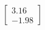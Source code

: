 \documentclass[preview]{standalone}
\begin{document}
\begin{align*}
\begin{bmatrix} 3.16 \\ -1.98 \end{bmatrix}
\end{align*}
\end{document}
